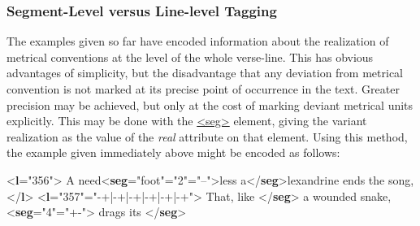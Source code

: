 \subsubsection[{Segment-Level versus Line-level Tagging}]{Segment-Level versus Line-level Tagging}\label{VEMElevels}\par
The examples given so far have encoded information about the realization of metrical conventions at the level of the whole verse-line. This has obvious advantages of simplicity, but the disadvantage that any deviation from metrical convention is not marked at its precise point of occurrence in the text. Greater precision may be achieved, but only at the cost of marking deviant metrical units explicitly. This may be done with the \hyperref[TEI.seg]{<seg>} element, giving the variant realization as the value of the {\itshape real} attribute on that element. Using this method, the example given immediately above might be encoded as follows: \par\bgroup{}\exampleFont \begin{shaded}\noindent\mbox{}{<\textbf{l}\hspace*{1em}{n}="{356}">} A need{<\textbf{seg}\hspace*{1em}{type}="{foot}"\hspace*{1em}{n}="{2}"\hspace*{1em}{real}="{--}">}less a{</\textbf{seg}>}lexandrine ends the song,{</\textbf{l}>}\mbox{}\newline 
{<\textbf{l}\hspace*{1em}{n}="{357}"\hspace*{1em}{met}="{-+|-+|-+|-+|-+|-+}">}\mbox{}\newline 
{} That, like {</\textbf{seg}>} a wounded snake, {<\textbf{seg}\hspace*{1em}{n}="{4}"\hspace*{1em}{real}="{+-}">} drags its {</\textbf{seg}>}\mbox{}\newline 

\end{shaded}
